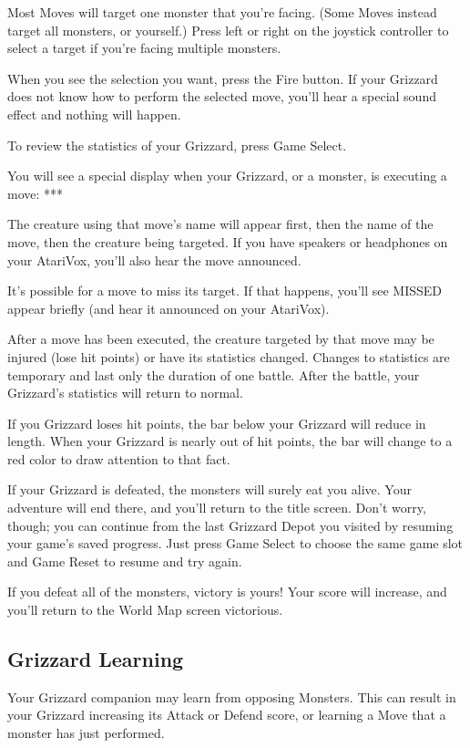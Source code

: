 \documentclass[12pt,twoside,openright,book]{memoir}
\begin{document}
Most  Moves will  target one  monster  that you're  facing. (Some  Moves
instead target  all monsters, or yourself.)  Press left or right  on the
joystick   controller   to   select    a   target   if   you're   facing
multiple monsters.

When you  see the  selection you  want, press the  Fire button.  If your
Grizzard does  not know how  to perform  the selected move,  you'll hear
a special sound effect and nothing will happen.

To review the statistics of your Grizzard, press Game Select.

You will  see a  special display  when your Grizzard,  or a  monster, is
executing a move: ***

The creature using that move's name  will appear first, then the name of
the move,  then the  creature being  targeted. If  you have  speakers or
headphones on your AtariVox, you'll also hear the move announced.

It's possible for a move to miss its target. If that happens, you'll see
MISSED appear briefly (and hear it announced on your AtariVox).

After a move  has been executed, the creature targeted  by that move may
be injured (lose hit points) or  have its statistics changed. Changes to
statistics  are temporary  and last  only  the duration  of one  battle.
After the battle, your Grizzard's statistics will return to normal.

If  you Grizzard  loses hit  points, the  bar below  your Grizzard  will
reduce in  length. When your Grizzard  is nearly out of  hit points, the
bar will change to a red color to draw attention to that fact.

If your  Grizzard is defeated, the  monsters will surely eat  you alive.
Your adventure  will end there, and  you'll return to the  title screen.
Don't worry, though;  you can continue from the last  Grizzard Depot you
visited by resuming  your game's saved progress. Just  press Game Select
to choose the same game slot and Game Reset to resume and try again.

If you  defeat all of  the monsters, victory  is yours! Your  score will
increase, and you'll return to the World Map screen victorious.

\subsection{Grizzard Learning}

Your  Grizzard companion  may  learn from  opposing  Monsters. This  can
result  in your  Grizzard  increasing  its Attack  or  Defend score,  or
learning a Move that a monster has just performed.
\end{document}

